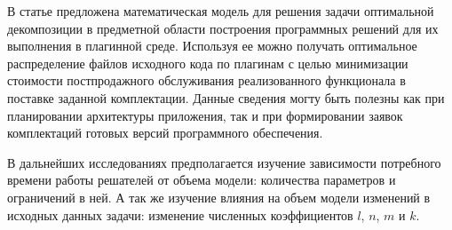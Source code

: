 В статье предложена математическая модель для решения задачи оптимальной декомпозиции в предметной области построения программных решений для их выполнения в плагинной среде. Используя ее можно получать оптимальное распределение файлов исходного кода по плагинам с целью минимизации стоимости постпродажного обслуживания реализованного функционала в поставке заданной комплектации. Данные сведения могту быть полезны как при планировании архитектуры приложения, так и при формировании заявок комплектаций готовых версий программного обеспечения.

В дальнейших исследованиях предполагается изучение зависимости потребного времени работы решателей от объема модели: количества параметров и ограничений в ней. А так же изучение влияния на объем модели изменений в исходных данных задачи: изменение численных коэффициентов $l$, $n$, $m$ и $k$.
